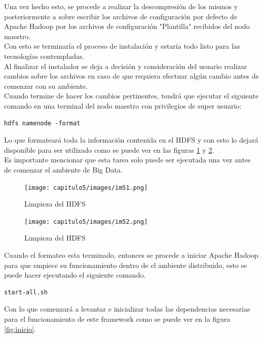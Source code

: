 Una vez hecho esto, se procede a realizar la descompresión de los mismos y posteriormente a sobre escribir los archivos de configuración por defecto de Apache Hadoop por los archivos de configuración "Plantilla" recibidos del nodo maestro.\\
Con esto se terminaría el proceso de instalación y estaría todo listo para las tecnologías contempladas.\\
Al finalizar el instalador se deja a decisión y consideración del usuario realizar cambios sobre los archivos en caso de que requiera efectuar algún cambio antes de comenzar con su ambiente.\\
Cuando termine de hacer los cambios pertinentes, tendrá que ejecutar el siguiente comando en una terminal del nodo maestro con privilegios de super usuario:
\begin{verbatim}
hdfs namenode -format
\end{verbatim}
Lo que formateará toda la información contenida en el HDFS y con esto lo dejará disponible para ser utilizado como se puede ver en las figuras \ref{fig:limpieza} y \ref{fig:limpieza1}.
\\
Es importante mencionar que esta tarea solo puede ser ejecutada una vez antes de comenzar el ambiente de Big Data. 
\begin{figure}[H]
	\hypertarget{fig:limpieza}{\hspace{1pt}}
	\begin{center}	
		\texttt{[image: capitulo5/images/im51.png]}
		\caption{Limpieza del HDFS}
		\label{fig:limpieza}
	\end{center}
\end{figure}
\begin{figure}[H]
	\hypertarget{fig:limpieza1}{\hspace{1pt}}
	\begin{center}	
		\texttt{[image: capitulo5/images/im52.png]}
		\caption{Limpieza del HDFS}
		\label{fig:limpieza1}
	\end{center}
\end{figure}
Cuando el formateo esta terminado, entonces se procede a iniciar Apache Hadoop para que empiece su funcionamiento dentro de el ambiente distribuido, esto se puede hacer ejecutando el siguiente comando.
\begin{verbatim}
start-all.sh
\end{verbatim}
Con lo que comenzará a levantar e inicializar todas las dependencias necesarias para el funcionamiento de este framework como se puede ver en la figura \ref{fig:inicio}. 
